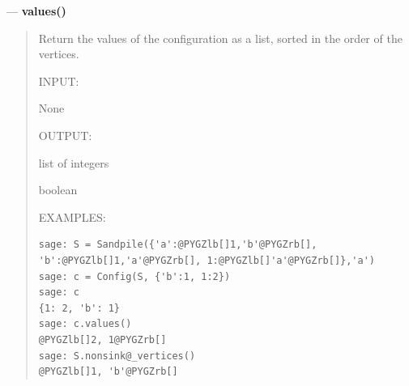 \documentclass[letterpaper,10pt,english]{manual}
\begin{document}
---
\hypertarget{values}{}
\textbf{values()}
\begin{quote}

Return the values of the configuration as a list, sorted in the order
of the vertices.

INPUT:

None

OUTPUT:

list of integers

boolean

EXAMPLES:

\begin{Verbatim}[commandchars=@\[\]]
sage: S = Sandpile({'a':@PYGZlb[]1,'b'@PYGZrb[], 'b':@PYGZlb[]1,'a'@PYGZrb[], 1:@PYGZlb[]'a'@PYGZrb[]},'a')
sage: c = Config(S, {'b':1, 1:2})
sage: c
{1: 2, 'b': 1}
sage: c.values()
@PYGZlb[]2, 1@PYGZrb[]
sage: S.nonsink@_vertices()
@PYGZlb[]1, 'b'@PYGZrb[]
\end{Verbatim}
\end{quote}
\end{document}
